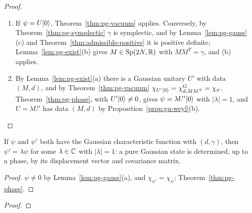 \begin{veteenv}
\begin{proof}
\begin{enumerate}
\item[(a)] If $\psi=U\lvert 0\rangle$, Theorem~\ref{thm:pg-vacuum} applies. Conversely, by Theorem~\ref{thm:pg-symplectic} $\gamma$ is symplectic, and by
Lemma~\ref{lem:pg-gauss}(c) and Theorem~\ref{thm:admissible-positive} it is positive definite; Lemma~\ref{lem:pg-exist}(b) gives
$M\in\mathrm{Sp}(2N,\mathbb R)$ with $MM^T=\gamma$, and (b) applies.
\item[(b)] By Lemma~\ref{lem:pg-exist}(a) there is a Gaussian unitary $U'$ with data $(M,d)$, and by Theorem~\ref{thm:pg-vacuum}
$\chi_{U'\lvert 0\rangle}=\chi^{\mathrm G}_{d,MM^T}=\chi_\psi$. Theorem~\ref{thm:pg-phase}, with $U'\lvert 0\rangle\ne0$, gives $\psi=\lambda U'\lvert 0\rangle$ with $\lvert\lambda\rvert=1$,
and $U=\lambda U'$ has data $(M,d)$ by Proposition~\ref{prop:gu-weyl}(b).\qedhere
\end{enumerate}
\end{proof}

\begin{corollary}[Uniqueness]\label{cor:pg-unique}
If $\psi$ and $\psi'$ both have the Gaussian characteristic function with $(d,\gamma)$, then $\psi'=\lambda\psi$ for some $\lambda\in\mathbb C$ with
$\lvert\lambda\rvert=1$: a pure Gaussian state is determined, up to a phase, by its displacement vector and covariance matrix.
\end{corollary}

\begin{proof}
$\psi\ne0$ by Lemma~\ref{lem:pg-gauss}(a), and $\chi_{\psi'}=\chi_\psi$; Theorem~\ref{thm:pg-phase}.
\end{proof}


\begin{corollary}\label{cor:pg-exist}
\end{corollary}

\begin{proof}
\end{proof}


\end{veteenv}

